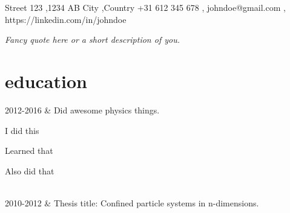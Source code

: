 \documentclass[changecolor={206, 23, 21}]{cv-roald}
\begin{document}
\pagestyle{empty} %

	{\faMapMarker \hspace{\FAspace} Street 123 \sep 1234 AB City \sep Country}
	{\faMobile \hspace{\FAspace} +31 612 345 678 \sep 
	 \faEnvelope \hspace{\FAspace} johndoe@gmail.com \sep 
	 \faLinkedinSquare \hspace{\FAspace} https://linkedin.com/in/johndoe
}


\textit{Fancy quote here or a short description of you.}

\section*{education}
\begin{tabularcv}
	2012-2016   &   
	\newline Did awesome physics things.
	\begin{tabitemize}
		\item I did this
		\item Learned that
		\item Also did that
	\end{tabitemize} 
	\\[\vspacepar] %
	2010-2012   &   
	\newline Thesis title: Confined particle systems in n-dimensions.
\end{tabularcv}
\end{document}
